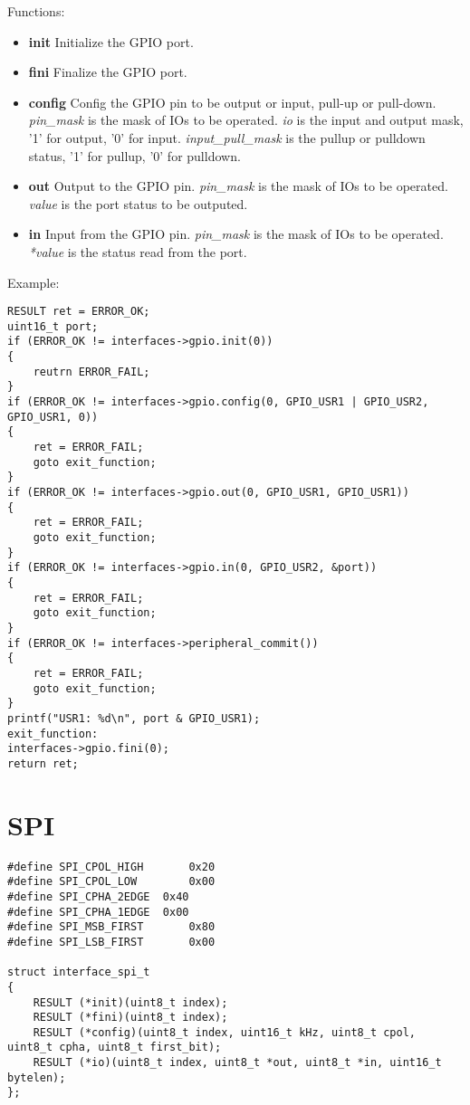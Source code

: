 \documentclass[a4paper,12pt]{book}
\begin{document}
\vspace{6pt}
Functions:
\begin{itemize}
\item \textbf{init}
Initialize the GPIO port.
\item \textbf{fini}
Finalize the GPIO port.
\item \textbf{config}
Config the GPIO pin to be output or input, pull-up or pull-down.
\newline\emph{pin\_mask} is the mask of IOs to be operated.
\newline\emph{io} is the input and output mask, '1' for output, '0' for input.
\newline\emph{input\_pull\_mask} is the pullup or pulldown status, '1' for pullup, '0' for pulldown.
\item \textbf{out}
Output to the GPIO pin.
\newline\emph{pin\_mask} is the mask of IOs to be operated.
\newline\emph{value} is the port status to be outputed.
\item \textbf{in}
Input from the GPIO pin.
\newline\emph{pin\_mask} is the mask of IOs to be operated.
\newline\emph{*value} is the status read from the port.
\end{itemize}

\vspace{6pt}
Example:
\begin{lstlisting}
RESULT ret = ERROR_OK;
uint16_t port;
if (ERROR_OK != interfaces->gpio.init(0))
{
	reutrn ERROR_FAIL;
}
if (ERROR_OK != interfaces->gpio.config(0, GPIO_USR1 | GPIO_USR2, GPIO_USR1, 0))
{
	ret = ERROR_FAIL;
	goto exit_function;
}
if (ERROR_OK != interfaces->gpio.out(0, GPIO_USR1, GPIO_USR1))
{
	ret = ERROR_FAIL;
	goto exit_function;
}
if (ERROR_OK != interfaces->gpio.in(0, GPIO_USR2, &port))
{
	ret = ERROR_FAIL;
	goto exit_function;
}
if (ERROR_OK != interfaces->peripheral_commit())
{
	ret = ERROR_FAIL;
	goto exit_function;
}
printf("USR1: %d\n", port & GPIO_USR1);
exit_function:
interfaces->gpio.fini(0);
return ret;
\end{lstlisting}

\newpage
\section{SPI}
\begin{lstlisting}
#define SPI_CPOL_HIGH		0x20
#define SPI_CPOL_LOW		0x00
#define SPI_CPHA_2EDGE	0x40
#define SPI_CPHA_1EDGE	0x00
#define SPI_MSB_FIRST		0x80
#define SPI_LSB_FIRST		0x00

struct interface_spi_t
{
	RESULT (*init)(uint8_t index);
	RESULT (*fini)(uint8_t index);
	RESULT (*config)(uint8_t index, uint16_t kHz, uint8_t cpol, uint8_t cpha, uint8_t first_bit);
	RESULT (*io)(uint8_t index, uint8_t *out, uint8_t *in, uint16_t bytelen);
};
\end{lstlisting}
\end{document}
